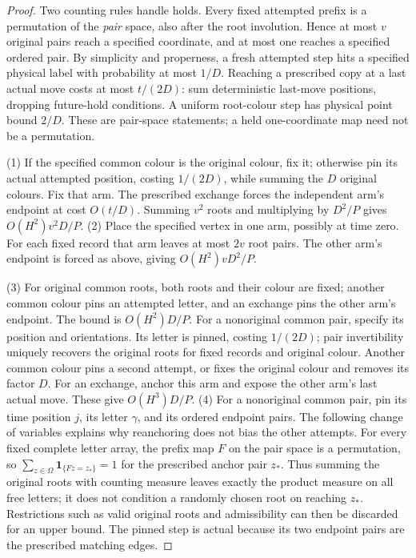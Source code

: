 \begin{proof}
Two counting rules handle holds. Every fixed attempted prefix is a
permutation of the \emph{pair} space, also after the root involution.
Hence at most $v$ original pairs reach a specified coordinate, and at most one reaches a specified ordered pair. By simplicity and
properness, a fresh attempted step
hits a specified physical label with probability at most $1/D$. Reaching a prescribed copy at a last actual move costs at most $t/(2D)$: sum deterministic last-move positions, dropping future-hold conditions. A uniform root-colour step has physical point bound $2/D$. These are pair-space statements; a held one-coordinate map need not
be a permutation.

(1) If the specified common colour is the original colour, fix it;
otherwise pin its actual attempted position, costing $1/(2D)$, while summing the $D$ original colours. Fix that arm. The prescribed exchange forces the independent arm's endpoint at cost $O(t/D)$. Summing $v^2$ roots and multiplying by $D^2/P$ gives $O(H^2)v^2D/P$.
(2) Place the specified vertex in one arm, possibly at time zero.
For each fixed record that arm leaves at most $2v$ root pairs. The other arm's endpoint is forced as above, giving $O(H^2)vD^2/P$.

(3) For original common roots, both roots and their colour are fixed;
another common colour pins an attempted letter, and an exchange pins
the other arm's endpoint. The bound is $O(H^2)D/P$. For a nonoriginal common pair, specify its position and orientations.
Its letter is pinned, costing $1/(2D)$; pair invertibility uniquely recovers the original roots for fixed records and original colour.
Another common colour pins a second attempt, or fixes the original
colour and removes its factor $D$. For an exchange, anchor this arm and expose the other arm's last actual move. These give $O(H^3)D/P$.
(4) For a nonoriginal common pair, pin its time position $j$, its letter $\gamma$, and its ordered endpoint pairs. The following change of variables explains why reanchoring does not bias the other
attempts. For every fixed complete letter array, the prefix map $F$ on the pair space is a permutation, so $\sum_{z\in\Omega}\mathbf1_{\{Fz=z_*\}}=1$ for the prescribed anchor pair $z_*$. Thus summing the original roots with counting measure leaves exactly the product measure on all free letters;
it does not condition a randomly chosen root on reaching $z_*$. Restrictions such as valid original roots and admissibility can
then be discarded for an upper bound. The pinned step is actual
because its two endpoint pairs are the prescribed matching edges.


\end{proof}
